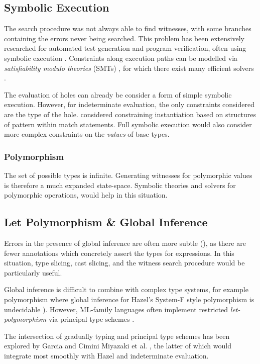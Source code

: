 \subsection{Symbolic Execution}
The search procedure was not always able to find witnesses, with some branches containing the errors never being searched. This problem has been extensively researched for automated test generation and program verification, often using symbolic execution \cite{SymbolicExecutionSurvey}. Constraints along execution paths can be modelled via \textit{satisfiability modulo theories} (SMTs) \cite{SMTs}, for which there exist many efficient solvers \cite{SMTSolver}.

The evaluation of holes can already be consider a form of simple {symbolic execution}. However, for indeterminate evaluation, the only constraints considered are the type of the hole.  considered constraining instantiation based on structures of pattern within match statements. Full symbolic execution would also consider more complex constraints on the \textit{values} of base types.

\subsubsection{Polymorphism}
The set of possible types is infinite. Generating witnesses for polymorphic values is therefore a much expanded state-space. Symbolic theories and solvers for polymorphic operations, would help in this situation.

\subsection{Let Polymorphism \& Global Inference}
Errors in the presence of global inference are often more subtle (\cite{SubtleOCamlErrors}), as there are fewer annotations which concretely assert the types for expressions. In this situation, type slicing, cast slicing, and the witness search procedure would be particularly useful.

Global inference is difficult to combine with complex type systems, for example polymorphism where global inference for Hazel's System-F style polymorphism is undecidable \cite{SystemFUndecidable}). However, ML-family languages often implement restricted \textit{let-polymorphism} via principal type schemes \cite{PrincipalTypeSchemes}.

The intersection of gradually typing and principal type schemes has been explored by Garcia and Cimini \cite{GradualTI} Miyazaki et al. \cite{DTI}, the latter of which would integrate most smoothly with Hazel and indeterminate evaluation. 

